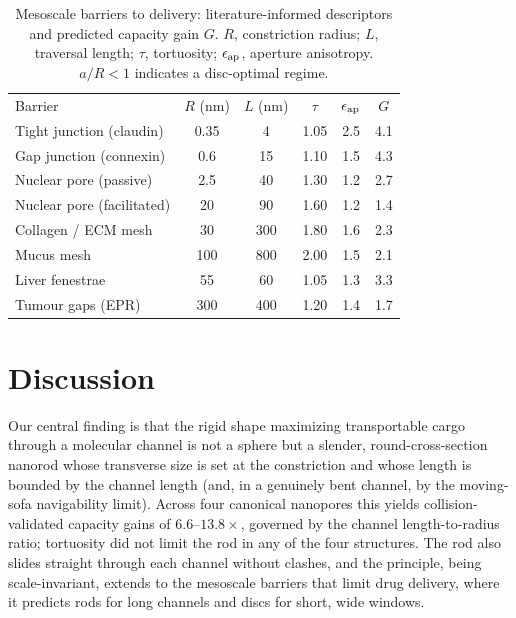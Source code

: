 \documentclass[aps,pre,twocolumn,superscriptaddress,floatfix,nofootinbib]{revtex4-2}
\begin{document}
\begin{table}[t]
\caption{Mesoscale barriers to delivery: literature-informed descriptors and
predicted capacity gain $G$. $R$, constriction radius; $L$, traversal length;
$\tau$, tortuosity; $\epsilon_{\rm ap}$, aperture anisotropy. $a/R<1$ indicates a
disc-optimal regime.}
\label{tab:meso}
\begin{ruledtabular}
\begin{tabular}{lccccc}
Barrier & $R$ (nm) & $L$ (nm) & $\tau$ & $\epsilon_{\rm ap}$ & $G$ \\
\colrule
Tight junction (claudin)   & 0.35 & 4   & 1.05 & 2.5 & 4.1 \\
Gap junction (connexin)    & 0.6  & 15  & 1.10 & 1.5 & 4.3 \\
Nuclear pore (passive)     & 2.5  & 40  & 1.30 & 1.2 & 2.7 \\
Nuclear pore (facilitated) & 20   & 90  & 1.60 & 1.2 & 1.4 \\
Collagen / ECM mesh        & 30   & 300 & 1.80 & 1.6 & 2.3 \\
Mucus mesh                 & 100  & 800 & 2.00 & 1.5 & 2.1 \\
Liver fenestrae            & 55   & 60  & 1.05 & 1.3 & 3.3 \\
Tumour gaps (EPR)          & 300  & 400 & 1.20 & 1.4 & 1.7 \\
\end{tabular}
\end{ruledtabular}
\end{table}

\section{Discussion}

Our central finding is that the rigid shape maximizing transportable cargo
through a molecular channel is not a sphere but a slender, round-cross-section
nanorod whose transverse size is set at the constriction and whose length is
bounded by the channel length (and, in a genuinely bent channel, by the
moving-sofa navigability limit). Across four canonical nanopores this yields
collision-validated capacity gains of $6.6$--$13.8\times$, governed by the
channel length-to-radius ratio; tortuosity did not limit the rod in any of the
four structures. The rod also slides straight through each channel without
clashes, and the principle, being scale-invariant, extends to the mesoscale
barriers that limit drug delivery, where it predicts rods for long channels and
discs for short, wide windows.
\end{document}
